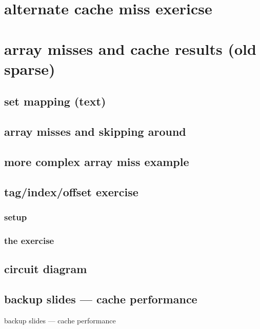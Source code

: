 \section{alternate cache miss exericse}


\section{array misses and cache results (old sparse)}


\subsection{set mapping (text)}


\subsection{array misses and skipping around}


\subsection{more complex array miss example}


\subsection{tag/index/offset exercise}
\subsubsection{setup}

\subsubsection{the exercise}


\subsection{circuit diagram}



\subsection{backup slides --- cache performance}
\begin{frame}{backup slides --- cache performance}
\end{frame}

